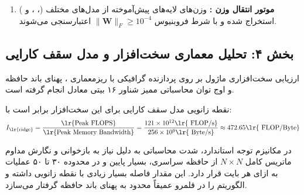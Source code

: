 \begin{enumerate}
\begin{itemize}
        \item \textbf{گردآوری فشرده کلیدها و مقادیر:} با بهره‌گیری از  بر روی بعد توالی، تانسورهای فشرده‌شده $\mathbf{K}_{\text{\lr{pruned}}}$ و $\mathbf{V}_{\text{\lr{pruned}}}$ با ابعاد منقبض‌شده $[B, H, k, d]$ بازآرایی می‌گردند.
        \item \textbf{محاسبه ضرب تانسوری نامتقارن:} حاصل‌ضرب $\mathbf{Q} \mathbf{K}_{\text{\lr{pruned}}}^\top$ ماتریس توجه با ابعاد $[B, H, N, k]$ را می‌سازد. تابع  از وقوع خطای سرریز/زیرریز در دقت  جلوگیری می‌کند.
        \item \textbf{سنتز خروجی و ادغام:} ضرب وزن‌های نرمال‌شده در $\mathbf{V}_{\text{\lr{pruned}}}$ تانسوری با شکل $[B, H, N, d]$ ایجاد کرده که با دستور  یکپارچه‌سازی شده و از لایه پروجکشن پایانی  عبور می‌کند. در صورتی که ماژول به عنوان یک انکودر تودرتو  در مدل‌هایی چون  به کار گرفته شود، پروجکشن دوم به صورت خودکار کنار گذاشته می‌شود تا از تکرار لایه متراکم جلوگیری به عمل آید.
    \end{itemize}
    \item \textbf{موتور انتقال وزن :} وزن‌های لایه‌های پیش‌آموخته از مدل‌های مختلف (، ،  و ) استخراج شده و با شرط فروبنیوس $\|\mathbf{W}\|_F \ge 10^{-4}$ اعتبارسنجی می‌شوند.
\end{enumerate}

\subsection*{بخش ۴: تحلیل معماری سخت‌افزار و مدل سقف کارایی }
ارزیابی سخت‌افزاری ماژول  بر روی پردازنده گرافیکی  با ریزمعماری ، پهنای باند حافظه  و اوج توان محاسباتی ممیز شناور ۱۶ بیتی معادل  انجام گرفته است. 

نقطه زانویی مدل سقف کارایی  برای این سخت‌افزار برابر است با:
\begin{equation}
I_{\text{\lr{ridge}}} = \frac{\text{\lr{Peak FLOPS}}}{\text{\lr{Peak Memory Bandwidth}}} = \frac{121 \times 10^{12} \text{\lr{ FLOP/s}}}{256 \times 10^9 \text{\lr{ Byte/s}}} \approx 472.65 \text{\lr{ FLOP/Byte}}
\end{equation}

در مکانیزم توجه استاندارد، شدت محاسباتی  به دلیل نیاز به بازخوانی و نگارش مداوم ماتریس کامل $N \times N$ از حافظه سراسری، بسیار پایین و در محدوده ۳۰ تا ۵۰ عملیات به ازای هر بایت قرار دارد. این مقدار فاصله بسیار زیادی با نقطه زانویی داشته و الگوریتم را در قلمرو عمیقاً محدود به پهنای باند حافظه  گرفتار می‌سازد.

